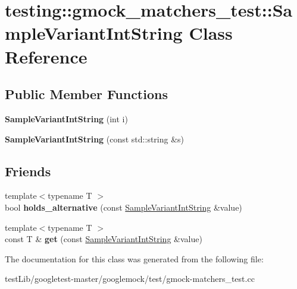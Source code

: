 \hypertarget{classtesting_1_1gmock__matchers__test_1_1SampleVariantIntString}{}\section{testing\+:\+:gmock\+\_\+matchers\+\_\+test\+:\+:Sample\+Variant\+Int\+String Class Reference}
\label{classtesting_1_1gmock__matchers__test_1_1SampleVariantIntString}
\subsection*{Public Member Functions}
\begin{DoxyCompactItemize}
\item 
\mbox{\label{classtesting_1_1gmock__matchers__test_1_1SampleVariantIntString_a362f135d65f8dd024202cc4908b510e2}} 
{\bfseries Sample\+Variant\+Int\+String} (int i)
\item 
\mbox{\label{classtesting_1_1gmock__matchers__test_1_1SampleVariantIntString_a2cca84a8b8af0726efab2b28df5e2880}} 
{\bfseries Sample\+Variant\+Int\+String} (const std\+::string \&s)
\end{DoxyCompactItemize}
\subsection*{Friends}
\begin{DoxyCompactItemize}
\item 
\mbox{\label{classtesting_1_1gmock__matchers__test_1_1SampleVariantIntString_a3139754402f0352ddea2ba7823ad16f1}} 
{\footnotesize template$<$typename T $>$ }\\bool {\bfseries holds\+\_\+alternative} (const \hyperlink{classtesting_1_1gmock__matchers__test_1_1SampleVariantIntString}{Sample\+Variant\+Int\+String} \&value)
\item 
\mbox{\label{classtesting_1_1gmock__matchers__test_1_1SampleVariantIntString_a492b2fd643a25c4345f56c68369ebd54}} 
{\footnotesize template$<$typename T $>$ }\\const T \& {\bfseries get} (const \hyperlink{classtesting_1_1gmock__matchers__test_1_1SampleVariantIntString}{Sample\+Variant\+Int\+String} \&value)
\end{DoxyCompactItemize}


The documentation for this class was generated from the following file\+:\begin{DoxyCompactItemize}
\item 
test\+Lib/googletest-\/master/googlemock/test/gmock-\/matchers\+\_\+test.\+cc\end{DoxyCompactItemize}
